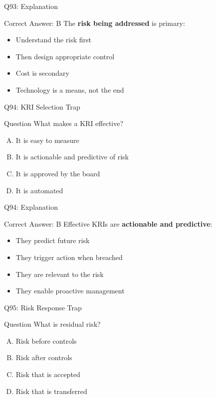 \documentclass{beamer}
\begin{document}
	\begin{frame}{Q93: Explanation}
		\begin{block}{Correct Answer: B}
			The \textbf{risk being addressed} is primary:
			\begin{itemize}
				\item Understand the risk first
				\item Then design appropriate control
				\item Cost is secondary
				\item Technology is a means, not the end
			\end{itemize}
		\end{block}
	\end{frame}
	
	\begin{frame}{Q94: KRI Selection Trap}
		\begin{block}{Question}
			What makes a KRI effective?
		\end{block}
		\begin{enumerate}[(A)]
			\item It is easy to measure
			\item It is actionable and predictive of risk
			\item It is approved by the board
			\item It is automated
		\end{enumerate}
	\end{frame}
	
	\begin{frame}{Q94: Explanation}
		\begin{block}{Correct Answer: B}
			Effective KRIs are \textbf{actionable and predictive}:
			\begin{itemize}
				\item They predict future risk
				\item They trigger action when breached
				\item They are relevant to the risk
				\item They enable proactive management
			\end{itemize}
		\end{block}
	\end{frame}
	
	\begin{frame}{Q95: Risk Response Trap}
		\begin{block}{Question}
			What is residual risk?
		\end{block}
		\begin{enumerate}[(A)]
			\item Risk before controls
			\item Risk after controls
			\item Risk that is accepted
			\item Risk that is transferred
		\end{enumerate}
	\end{frame}
	
\end{document}
